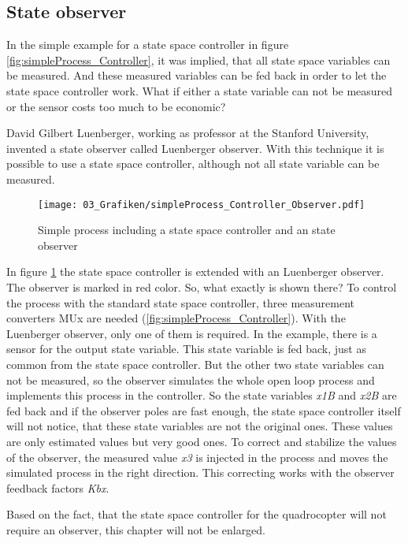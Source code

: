\clearpage
\subsection{State observer}

In the simple example for a state space controller in figure \ref{fig:simpleProcess_Controller}, it was implied, that all state space variables can be measured. And these measured variables can be fed back in order to let the state space controller work. What if either a state variable can not be measured or the sensor costs too much to be economic?

David Gilbert Luenberger, working as professor at the Stanford University, invented a state observer called Luenberger observer. With this technique it is possible to use a state space controller, although not all state variable can be measured. 

\begin{figure}
	\centering
		\texttt{[image: 03\_Grafiken/simpleProcess\_Controller\_Observer.pdf]}
	\caption{Simple process including a state space controller and an state observer}
	\label{fig:simpleProcess_Controller_Observer}
\end{figure}

In figure \ref{fig:simpleProcess_Controller_Observer} the state space controller is extended with an Luenberger observer. The observer is marked in red color. So, what exactly is shown there? To control the process with the standard state space controller, three measurement converters MUx are needed (\ref{fig:simpleProcess_Controller}). With the Luenberger observer, only one of them is required. In the example, there is a sensor for the output state variable. This state variable is fed back, just as common from the state space controller. But the other two state variables can not be measured, so the observer simulates the whole open loop process and implements this process in the controller. So the state variables \textit{x1B} and \textit{x2B} are fed back and if the observer poles are fast enough, the state space controller itself will not notice, that these state variables are not the original ones. These values are only estimated values but very good ones. To correct and stabilize the values of the observer, the measured value \textit{x3} is injected in the process and moves the simulated process in the right direction. This correcting works with the observer feedback factors \textit{Kbx}. 

Based on the fact, that the state space controller for the quadrocopter will not require an observer, this chapter will not be enlarged. 